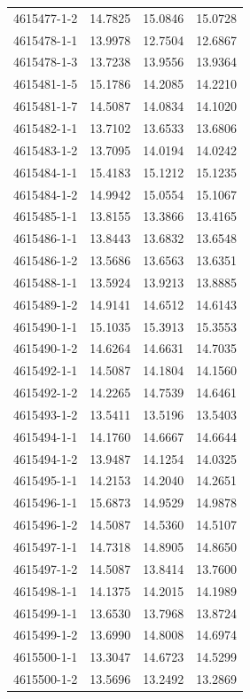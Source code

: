 \begin{longtable}{lrrr}
4615477-1-2 & 14.7825 & 15.0846 & 15.0728 \\
4615478-1-1 & 13.9978 & 12.7504 & 12.6867 \\
4615478-1-3 & 13.7238 & 13.9556 & 13.9364 \\
4615481-1-5 & 15.1786 & 14.2085 & 14.2210 \\
4615481-1-7 & 14.5087 & 14.0834 & 14.1020 \\
4615482-1-1 & 13.7102 & 13.6533 & 13.6806 \\
4615483-1-2 & 13.7095 & 14.0194 & 14.0242 \\
4615484-1-1 & 15.4183 & 15.1212 & 15.1235 \\
4615484-1-2 & 14.9942 & 15.0554 & 15.1067 \\
4615485-1-1 & 13.8155 & 13.3866 & 13.4165 \\
4615486-1-1 & 13.8443 & 13.6832 & 13.6548 \\
4615486-1-2 & 13.5686 & 13.6563 & 13.6351 \\
4615488-1-1 & 13.5924 & 13.9213 & 13.8885 \\
4615489-1-2 & 14.9141 & 14.6512 & 14.6143 \\
4615490-1-1 & 15.1035 & 15.3913 & 15.3553 \\
4615490-1-2 & 14.6264 & 14.6631 & 14.7035 \\
4615492-1-1 & 14.5087 & 14.1804 & 14.1560 \\
4615492-1-2 & 14.2265 & 14.7539 & 14.6461 \\
4615493-1-2 & 13.5411 & 13.5196 & 13.5403 \\
4615494-1-1 & 14.1760 & 14.6667 & 14.6644 \\
4615494-1-2 & 13.9487 & 14.1254 & 14.0325 \\
4615495-1-1 & 14.2153 & 14.2040 & 14.2651 \\
4615496-1-1 & 15.6873 & 14.9529 & 14.9878 \\
4615496-1-2 & 14.5087 & 14.5360 & 14.5107 \\
4615497-1-1 & 14.7318 & 14.8905 & 14.8650 \\
4615497-1-2 & 14.5087 & 13.8414 & 13.7600 \\
4615498-1-1 & 14.1375 & 14.2015 & 14.1989 \\
4615499-1-1 & 13.6530 & 13.7968 & 13.8724 \\
4615499-1-2 & 13.6990 & 14.8008 & 14.6974 \\
4615500-1-1 & 13.3047 & 14.6723 & 14.5299 \\
4615500-1-2 & 13.5696 & 13.2492 & 13.2869 \\

\end{longtable}
